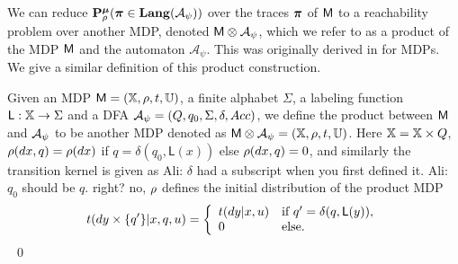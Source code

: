 \documentclass{ifacconf}
\newcommand{\red}[1]{{\color{red} #1}}
\renewcommand{\axx}[1]{{\color{orange} Ali: #1}}
\begin{document}
We can
reduce $\mathbf{P}_\rho^{\boldsymbol{\mu}}
({\boldsymbol{\pi}} \in\mathbf{Lang} (\mathcal A_\psi))$  over the traces ${\boldsymbol{\pi}}$ of $\mathsf{M}$ to a reachability problem
 over another MDP,  denoted  $\mathsf{M}\otimes\mathcal A_\psi$, which we refer to as a product of the MDP $\mathsf{M}$ and the automaton $\mathcal A_\psi$. This was originally derived in \citep{tmka2013} for MDPs. We give a similar definition of this product construction.
%
\begin{definition}
\label{def:product}
Given an MDP  $\mathsf{M} = ({\mathbb{X}}, \rho, t, {\mathbb{U}})$,
a finite alphabet $\Sigma$,
a labeling function $\mathsf{L}:{\mathbb{X}}\rightarrow\Sigma$
and a DFA  $\mathcal{A}_\psi = (Q, q_0, \Sigma, \delta, Acc)$,
we define the product between $\mathsf{M}$ and $\mathcal{A}_\psi$ to be another MDP denoted as
$\mathsf{M}\otimes\mathcal{A}_\psi = (\relax {\mathbb{X}}, \relax\rho,\relax{t},{\mathbb{U}})$.
Here $\relax {\mathbb{X}}= {\mathbb{X}}\times Q$, $\relax\rho(dx,q) = \rho(dx)$ if $q= \delta(q_0,\mathsf L(x))$ else $ \relax\rho(dx,q) =0$, and similarly the transition kernel is given as \axx{$\delta$ had a subscript when you first defined it.}
\axx{$q_0$ should be $q$. right?}\red{ no, $\relax\rho$ defines the initial distribution of the product MDP}
\begin{equation*}
  \relax{t}(d y\times\{q'\}|x,q,u) =  \left\{\begin{array}{ll}t(dy|x,u)& \text{if } q' =\delta(q,\mathsf{L}(y)),\\ 0 & \text{else.}  \end{array}\right.
\end{equation*} 
\hfill \mbox{ }\qed
\end{definition}

\end{document}
